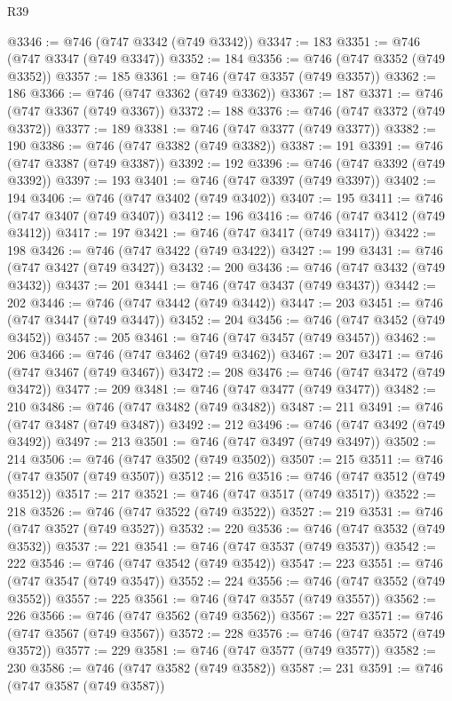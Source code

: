 \begin{lexlean}{R39}
\begin{coremodule}
@3346 := @746 (@747 @3342 (@749 @3342))
@3347 := 183
@3351 := @746 (@747 @3347 (@749 @3347))
@3352 := 184
@3356 := @746 (@747 @3352 (@749 @3352))
@3357 := 185
@3361 := @746 (@747 @3357 (@749 @3357))
@3362 := 186
@3366 := @746 (@747 @3362 (@749 @3362))
@3367 := 187
@3371 := @746 (@747 @3367 (@749 @3367))
@3372 := 188
@3376 := @746 (@747 @3372 (@749 @3372))
@3377 := 189
@3381 := @746 (@747 @3377 (@749 @3377))
@3382 := 190
@3386 := @746 (@747 @3382 (@749 @3382))
@3387 := 191
@3391 := @746 (@747 @3387 (@749 @3387))
@3392 := 192
@3396 := @746 (@747 @3392 (@749 @3392))
@3397 := 193
@3401 := @746 (@747 @3397 (@749 @3397))
@3402 := 194
@3406 := @746 (@747 @3402 (@749 @3402))
@3407 := 195
@3411 := @746 (@747 @3407 (@749 @3407))
@3412 := 196
@3416 := @746 (@747 @3412 (@749 @3412))
@3417 := 197
@3421 := @746 (@747 @3417 (@749 @3417))
@3422 := 198
@3426 := @746 (@747 @3422 (@749 @3422))
@3427 := 199
@3431 := @746 (@747 @3427 (@749 @3427))
@3432 := 200
@3436 := @746 (@747 @3432 (@749 @3432))
@3437 := 201
@3441 := @746 (@747 @3437 (@749 @3437))
@3442 := 202
@3446 := @746 (@747 @3442 (@749 @3442))
@3447 := 203
@3451 := @746 (@747 @3447 (@749 @3447))
@3452 := 204
@3456 := @746 (@747 @3452 (@749 @3452))
@3457 := 205
@3461 := @746 (@747 @3457 (@749 @3457))
@3462 := 206
@3466 := @746 (@747 @3462 (@749 @3462))
@3467 := 207
@3471 := @746 (@747 @3467 (@749 @3467))
@3472 := 208
@3476 := @746 (@747 @3472 (@749 @3472))
@3477 := 209
@3481 := @746 (@747 @3477 (@749 @3477))
@3482 := 210
@3486 := @746 (@747 @3482 (@749 @3482))
@3487 := 211
@3491 := @746 (@747 @3487 (@749 @3487))
@3492 := 212
@3496 := @746 (@747 @3492 (@749 @3492))
@3497 := 213
@3501 := @746 (@747 @3497 (@749 @3497))
@3502 := 214
@3506 := @746 (@747 @3502 (@749 @3502))
@3507 := 215
@3511 := @746 (@747 @3507 (@749 @3507))
@3512 := 216
@3516 := @746 (@747 @3512 (@749 @3512))
@3517 := 217
@3521 := @746 (@747 @3517 (@749 @3517))
@3522 := 218
@3526 := @746 (@747 @3522 (@749 @3522))
@3527 := 219
@3531 := @746 (@747 @3527 (@749 @3527))
@3532 := 220
@3536 := @746 (@747 @3532 (@749 @3532))
@3537 := 221
@3541 := @746 (@747 @3537 (@749 @3537))
@3542 := 222
@3546 := @746 (@747 @3542 (@749 @3542))
@3547 := 223
@3551 := @746 (@747 @3547 (@749 @3547))
@3552 := 224
@3556 := @746 (@747 @3552 (@749 @3552))
@3557 := 225
@3561 := @746 (@747 @3557 (@749 @3557))
@3562 := 226
@3566 := @746 (@747 @3562 (@749 @3562))
@3567 := 227
@3571 := @746 (@747 @3567 (@749 @3567))
@3572 := 228
@3576 := @746 (@747 @3572 (@749 @3572))
@3577 := 229
@3581 := @746 (@747 @3577 (@749 @3577))
@3582 := 230
@3586 := @746 (@747 @3582 (@749 @3582))
@3587 := 231
@3591 := @746 (@747 @3587 (@749 @3587))

\end{coremodule}
\end{lexlean}
